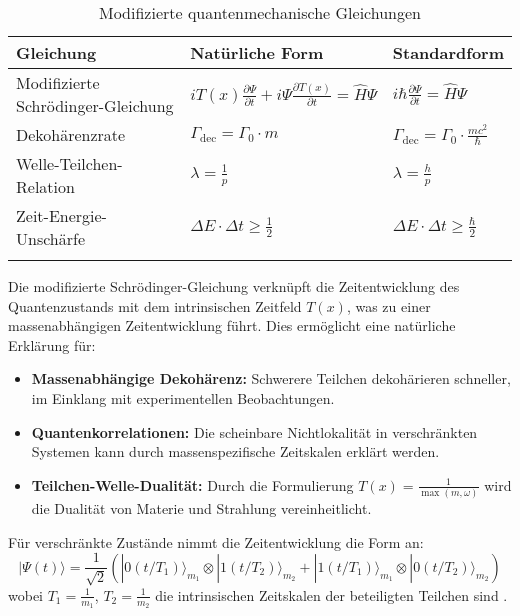 \documentclass[12pt,a4paper]{article}
\newcommand{\Tfield}{T(x)}
\begin{document}
	\begin{table}[ht]
		\centering
		\begin{adjustbox}{scale=1.1}
			\begin{tabular}{lll}
				\hline
				\textbf{Gleichung} & \textbf{Natürliche Form} & \textbf{Standardform} \\
				\hline
				Modifizierte Schrödinger-Gleichung & $i\Tfield\frac{\partial\Psi}{\partial t} + i\Psi\frac{\partial \Tfield}{\partial t} = \hat{H}\Psi$ & $i\hbar\frac{\partial\Psi}{\partial t} = \hat{H}\Psi$ \\
				Dekohärenzrate & $\Gamma_{\text{dec}} = \Gamma_0 \cdot m$ & $\Gamma_{\text{dec}} = \Gamma_0 \cdot \frac{mc^2}{\hbar}$ \\
				Welle-Teilchen-Relation & $\lambda = \frac{1}{p}$ & $\lambda = \frac{h}{p}$ \\
				Zeit-Energie-Unschärfe & $\Delta E \cdot \Delta t \geq \frac{1}{2}$ & $\Delta E \cdot \Delta t \geq \frac{\hbar}{2}$ \\
				\hline
			\multicolumn{2}{c}{} \\
				\hline
			\end{tabular}
		\end{adjustbox}
		\caption{Modifizierte quantenmechanische Gleichungen}
		\label{tab:qm_equations}
	\end{table}
	
	Die modifizierte Schrödinger-Gleichung verknüpft die Zeitentwicklung des Quantenzustands mit dem intrinsischen Zeitfeld $\Tfield$, was zu einer massenabhängigen Zeitentwicklung führt. Dies ermöglicht eine natürliche Erklärung für:
	
	\begin{itemize}
		\item \textbf{Massenabhängige Dekohärenz:} Schwerere Teilchen dekohärieren schneller, im Einklang mit experimentellen Beobachtungen.
		\item \textbf{Quantenkorrelationen:} Die scheinbare Nichtlokalität in verschränkten Systemen kann durch massenspezifische Zeitskalen erklärt werden.
		\item \textbf{Teilchen-Welle-Dualität:} Durch die Formulierung $\Tfield = \frac{1}{\max(m,\omega)}$ wird die Dualität von Materie und Strahlung vereinheitlicht.
	\end{itemize}
	
	Für verschränkte Zustände nimmt die Zeitentwicklung die Form an:
	\begin{equation}
		|\Psi(t)\rangle = \frac{1}{\sqrt{2}}\left(|0(t/T_1)\rangle_{m_1} \otimes |1(t/T_2)\rangle_{m_2} + |1(t/T_1)\rangle_{m_1} \otimes |0(t/T_2)\rangle_{m_2}\right)
	\end{equation}
	wobei $T_1 = \frac{1}{m_1}$, $T_2 = \frac{1}{m_2}$ die intrinsischen Zeitskalen der beteiligten Teilchen sind \cite{pascher_quantum_2025, pascher_photons_2025}.
	
\end{document}
